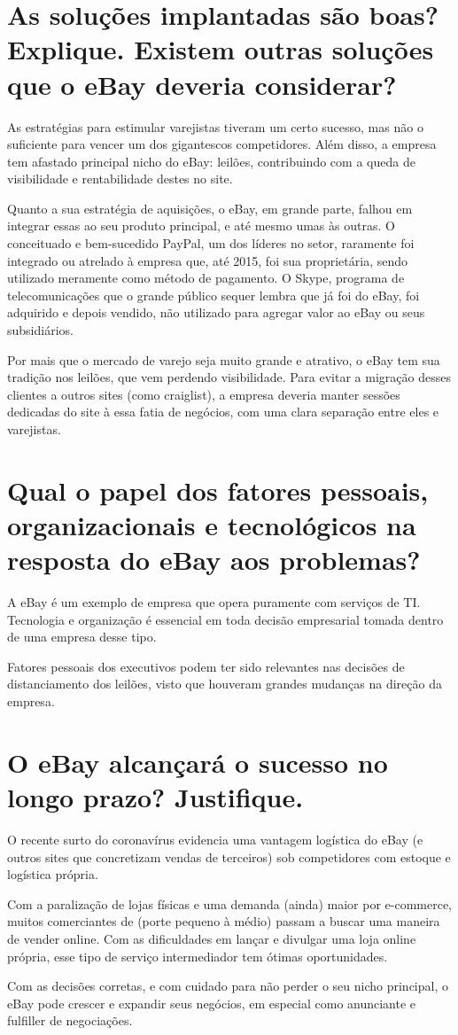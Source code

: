 \documentclass[12pt]{article}
\begin{document}
\section{As soluções implantadas são boas? Explique. Existem outras soluções que o eBay deveria considerar?}
As estratégias para estimular varejistas tiveram um certo sucesso, mas não o suficiente para vencer um dos gigantescos competidores. Além disso, a empresa tem afastado principal nicho do eBay: leilões, contribuindo com a queda de visibilidade e rentabilidade destes no site\cite{ebay_leiloes}.

Quanto a sua estratégia de aquisições, o eBay, em grande parte, falhou em integrar essas ao seu produto principal, e até mesmo umas às outras. O conceituado e bem-sucedido PayPal, um dos líderes no setor\cite{paypal_lider}, raramente foi integrado ou atrelado à empresa que, até 2015\cite{paypal_spinnof}, foi sua proprietária, sendo utilizado meramente como método de pagamento. O Skype, programa de telecomunicações que o grande público sequer lembra que já foi do eBay, foi adquirido\cite{compra_skype} e depois vendido\cite{venda_skype}, não utilizado para agregar valor ao eBay ou seus subsidiários.

Por mais que o mercado de varejo seja muito grande e atrativo, o eBay tem sua tradição nos leilões, que vem perdendo visibilidade. Para evitar a migração desses clientes a outros sites (como craiglist), a empresa deveria manter sessões dedicadas do site à essa fatia de negócios, com uma clara separação entre eles e varejistas.
\section{Qual o papel dos fatores pessoais, organizacionais e tecnológicos na resposta do eBay aos problemas?}
A eBay é um exemplo de empresa que opera puramente com serviços de TI. Tecnologia e organização é essencial em toda decisão empresarial tomada dentro de uma empresa desse tipo.

Fatores pessoais dos executivos podem ter sido relevantes nas decisões de distanciamento dos leilões, visto que houveram grandes mudanças na direção da empresa.
\section{O eBay alcançará o sucesso no longo prazo? Justifique.}
O recente surto do coronavírus evidencia uma vantagem logística do eBay (e outros sites que concretizam vendas de terceiros) sob competidores com estoque e logística própria\cite{amazon_preju}.

Com a paralização de lojas físicas e uma demanda (ainda) maior por e-commerce, muitos comerciantes de (porte pequeno à médio) passam a buscar uma maneira de vender online. Com as dificuldades em lançar e divulgar uma loja online própria, esse tipo de serviço intermediador tem ótimas oportunidades\cite{coronavirus_ebay}.

Com as decisões corretas, e com cuidado para não perder o seu nicho principal, o eBay pode crescer e expandir seus negócios, em especial como anunciante e fulfiller de negociações.

\end{document}
